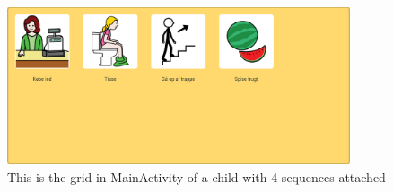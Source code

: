 \begin{figure} [h!]
\centering
\includegraphics[width=0.9\textwidth]{Pics/Sprint2/dialogs/magicGrid.png}
\caption{This is the grid in MainActivity of a child with 4 sequences attached}
\label{fig:GGridView}
\end{figure}




